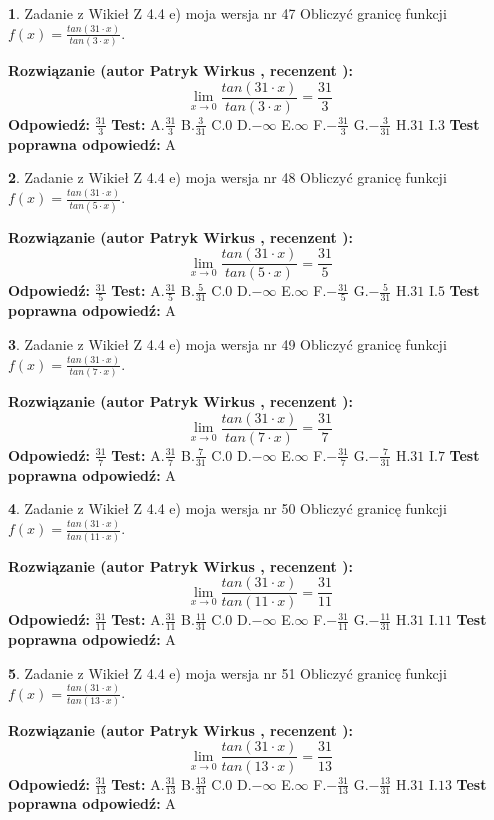 \documentclass[12pt, a4paper]{article}
\theoremstyle{definition} %
\newtheorem{zad}{}
\newcommand{\zadStart}[1]{\begin{zad}#1\newline}
\newcommand{\zadStop}{\end{zad}}
\newcommand{\rozwStart}[2]{\noindent \textbf{Rozwiązanie (autor #1 , recenzent #2): }\newline}
\newcommand{\rozwStop}{\newline}
\newcommand{\odpStart}{\noindent \textbf{Odpowiedź:}\newline}
\newcommand{\odpStop}{\newline}
\newcommand{\testStart}{\noindent \textbf{Test:}\newline}
\newcommand{\testStop}{\newline}
\newcommand{\kluczStart}{\noindent \textbf{Test poprawna odpowiedź:}\newline}
\newcommand{\kluczStop}{\newline}
\begin{document}
\zadStart{Zadanie z Wikieł Z 4.4 e) moja wersja nr 47}
Obliczyć granicę funkcji $f(x)=\frac{tan(31\cdot x)}{tan(3\cdot x)}$.
\zadStop
\rozwStart{Patryk Wirkus}{}
$$\lim\limits_{x\to 0}\frac{tan(31\cdot x)}{tan(3\cdot x)}=
\frac{31}{3}$$
\rozwStop
\odpStart
$\frac{31}{3}$
\odpStop
\testStart
A.$\frac{31}{3}$
B.$\frac{3}{31}$
C.$0$
D.$-\infty$
E.$\infty$
F.$-\frac{31}{3}$
G.$-\frac{3}{31}$
H.$31$
I.$3$
\testStop
\kluczStart
A
\kluczStop



\zadStart{Zadanie z Wikieł Z 4.4 e) moja wersja nr 48}
Obliczyć granicę funkcji $f(x)=\frac{tan(31\cdot x)}{tan(5\cdot x)}$.
\zadStop
\rozwStart{Patryk Wirkus}{}
$$\lim\limits_{x\to 0}\frac{tan(31\cdot x)}{tan(5\cdot x)}=
\frac{31}{5}$$
\rozwStop
\odpStart
$\frac{31}{5}$
\odpStop
\testStart
A.$\frac{31}{5}$
B.$\frac{5}{31}$
C.$0$
D.$-\infty$
E.$\infty$
F.$-\frac{31}{5}$
G.$-\frac{5}{31}$
H.$31$
I.$5$
\testStop
\kluczStart
A
\kluczStop



\zadStart{Zadanie z Wikieł Z 4.4 e) moja wersja nr 49}
Obliczyć granicę funkcji $f(x)=\frac{tan(31\cdot x)}{tan(7\cdot x)}$.
\zadStop
\rozwStart{Patryk Wirkus}{}
$$\lim\limits_{x\to 0}\frac{tan(31\cdot x)}{tan(7\cdot x)}=
\frac{31}{7}$$
\rozwStop
\odpStart
$\frac{31}{7}$
\odpStop
\testStart
A.$\frac{31}{7}$
B.$\frac{7}{31}$
C.$0$
D.$-\infty$
E.$\infty$
F.$-\frac{31}{7}$
G.$-\frac{7}{31}$
H.$31$
I.$7$
\testStop
\kluczStart
A
\kluczStop



\zadStart{Zadanie z Wikieł Z 4.4 e) moja wersja nr 50}
Obliczyć granicę funkcji $f(x)=\frac{tan(31\cdot x)}{tan(11\cdot x)}$.
\zadStop
\rozwStart{Patryk Wirkus}{}
$$\lim\limits_{x\to 0}\frac{tan(31\cdot x)}{tan(11\cdot x)}=
\frac{31}{11}$$
\rozwStop
\odpStart
$\frac{31}{11}$
\odpStop
\testStart
A.$\frac{31}{11}$
B.$\frac{11}{31}$
C.$0$
D.$-\infty$
E.$\infty$
F.$-\frac{31}{11}$
G.$-\frac{11}{31}$
H.$31$
I.$11$
\testStop
\kluczStart
A
\kluczStop



\zadStart{Zadanie z Wikieł Z 4.4 e) moja wersja nr 51}
Obliczyć granicę funkcji $f(x)=\frac{tan(31\cdot x)}{tan(13\cdot x)}$.
\zadStop
\rozwStart{Patryk Wirkus}{}
$$\lim\limits_{x\to 0}\frac{tan(31\cdot x)}{tan(13\cdot x)}=
\frac{31}{13}$$
\rozwStop
\odpStart
$\frac{31}{13}$
\odpStop
\testStart
A.$\frac{31}{13}$
B.$\frac{13}{31}$
C.$0$
D.$-\infty$
E.$\infty$
F.$-\frac{31}{13}$
G.$-\frac{13}{31}$
H.$31$
I.$13$
\testStop
\kluczStart
A
\kluczStop
\end{document}
